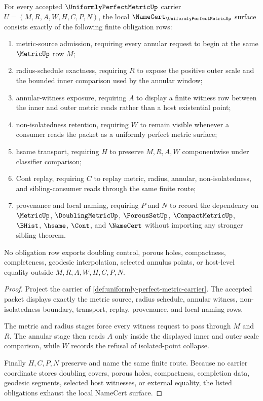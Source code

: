 \begin{theorem}
\label{thm:uniformly-perfect-metric-namecert-obligations}
For every accepted $\UniformlyPerfectMetricUp$ carrier $U=(M,R,A,W,H,C,P,N)$, the local $\NameCert_{\UniformlyPerfectMetricUp}$ surface consists exactly of the following finite obligation rows:
\begin{enumerate}
\item metric-source admission, requiring every annular request to begin at the same $\MetricUp$ row $M$;
\item radius-schedule exactness, requiring $R$ to expose the positive outer scale and the bounded inner comparison used by the annular window;
\item annular-witness exposure, requiring $A$ to display a finite witness row between the inner and outer metric reads rather than a host existential point;
\item non-isolatedness retention, requiring $W$ to remain visible whenever a consumer reads the packet as a uniformly perfect metric surface;
\item hsame transport, requiring $H$ to preserve $M,R,A,W$ componentwise under classifier comparison;
\item Cont replay, requiring $C$ to replay metric, radius, annular, non-isolatedness, and sibling-consumer reads through the same finite route;
\item provenance and local naming, requiring $P$ and $N$ to record the dependency on $\MetricUp$, $\DoublingMetricUp$, $\PorousSetUp$, $\CompactMetricUp$, $\BHist$, $\hsame$, $\Cont$, and $\NameCert$ without importing any stronger sibling theorem.
\end{enumerate}
No obligation row exports doubling control, porous holes, compactness, completeness, geodesic interpolation, selected annulus points, or host-level equality outside $M,R,A,W,H,C,P,N$.
\end{theorem}
\begin{proof}
Project the carrier of \autoref{def:uniformly-perfect-metric-carrier}. The accepted packet displays exactly the metric source, radius schedule, annular witness, non-isolatedness boundary, transport, replay, provenance, and local naming rows.

The metric and radius stages force every witness request to pass through $M$ and $R$. The annular stage then reads $A$ only inside the displayed inner and outer scale comparison, while $W$ records the refusal of isolated-point collapse.

Finally $H,C,P,N$ preserve and name the same finite route. Because no carrier coordinate stores doubling covers, porous holes, compactness, completion data, geodesic segments, selected host witnesses, or external equality, the listed obligations exhaust the local NameCert surface.
\end{proof}

